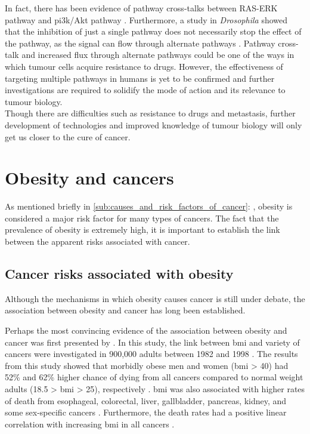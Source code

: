 In fact, there has been evidence of pathway cross-talks between RAS-ERK pathway and \gls{pi3k}/Akt pathway \citep{Moelling2002,Zimmermann1999a}.
Furthermore, a study in \textit{Drosophila} showed that the inhibition of just a single pathway does not necessarily stop the effect of the pathway, as the signal can flow through alternate pathways \citep{Dar2012}.
Pathway cross-talk and increased flux through alternate pathways could be one of the ways in which tumour cells acquire resistance to drugs.
However, the effectiveness of targeting multiple pathways in humans is yet to be confirmed and further investigations are required to solidify the mode of action and its relevance to tumour biology.
\\

\noindent
Though there are difficulties such as resistance to drugs and metastasis, further development of technologies and improved knowledge of tumour biology will only get us closer to the cure of cancer.

\section{Obesity and cancers}
\label{sec:obesity_and_cancers}

As mentioned briefly in \cref{sub:causes_and_risk_factors_of_cancer}: , obesity is considered a major risk factor for many types of cancers.
The fact that the prevalence of obesity is extremely high, it is important to establish the link between the apparent risks associated with cancer.

\subsection{Cancer risks associated with obesity}
\label{sub:cancer_risks_associated_with_obesity}

Although the mechanisms in which obesity causes cancer is still under debate, the association between obesity and cancer has long been established.

Perhaps the most convincing evidence of the association between obesity and cancer was first presented by \citet{Calle2003}.
In this study, the link between \gls{bmi} and variety of cancers were investigated in 900,000 adults between 1982 and 1998 \citep{Calle2003}.
The results from this study showed that morbidly obese men and women (\gls{bmi} \textgreater{} 40) had 52\% and 62\% higher chance of dying from all cancers compared to normal weight adults (18.5 \textgreater{} \gls{bmi} \textgreater{} 25), respectively \citep{Calle2003}.
\gls{bmi} was also associated with higher rates of death from esophageal, colorectal, liver, gallbladder, pancreas, kidney, and some sex-specific cancers \citep{Calle2003}.
Furthermore, the death rates had a positive linear correlation with increasing \gls{bmi} in all cancers \citep{Calle2003}.

